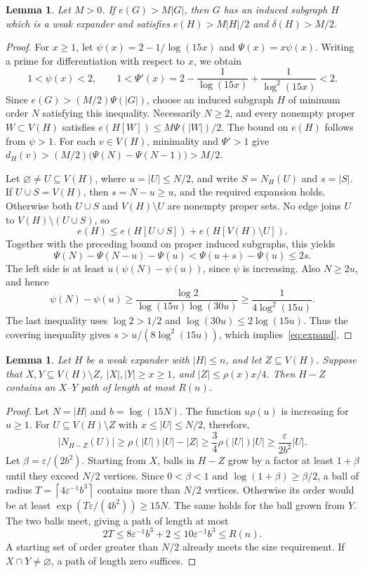 \documentclass[10pt,letterpaper]{article}
\newtheorem{lemma}[theorem]{Lemma}
\theoremstyle{definition}
\theoremstyle{remark}
\newcommand{\eps}{\varepsilon}
\begin{document}
\begin{lemma}\label{lem:extract}
Let $M>0$. If $e(G)>M|G|$, then $G$ has an induced subgraph $H$ which is a weak expander and satisfies $e(H)>M|H|/2$ and $\delta(H)>M/2$.
\end{lemma}
\begin{proof}
For $x\ge1$, let $\psi(x)=2-1/\log(15x)$ and $\Psi(x)=x\psi(x)$. Writing a prime for differentiation with respect to $x$, we obtain
\[
1<\psi(x)<2,\qquad
1<\Psi'(x)=2-\frac1{\log(15x)}+\frac1{\log^2(15x)}<2.
\]
Since $e(G)>(M/2)\Psi(|G|)$, choose an induced subgraph $H$ of minimum order $N$ satisfying this inequality. Necessarily $N\ge2$, and every nonempty proper $W\subset V(H)$ satisfies $e(H[W])\le M\Psi(|W|)/2$. The bound on $e(H)$ follows from $\psi>1$. For each $v\in V(H)$, minimality and $\Psi'>1$ give $d_H(v)>(M/2)\bigl(\Psi(N)-\Psi(N-1)\bigr)>M/2$.

Let $\varnothing\ne U\subseteq V(H)$, where $u=|U|\le N/2$, and write $S=N_H(U)$ and $s=|S|$. If $U\cup S=V(H)$, then $s=N-u\ge u$, and the required expansion holds. Otherwise both $U\cup S$ and $V(H)\setminus U$ are nonempty proper sets. No edge joins $U$ to $V(H)\setminus(U\cup S)$, so
\[
e(H)\le e(H[U\cup S])+e(H[V(H)\setminus U]).
\]
Together with the preceding bound on proper induced subgraphs, this yields
\[
\Psi(N)-\Psi(N-u)-\Psi(u)
<\Psi(u+s)-\Psi(u)\le2s.
\]
The left side is at least $u(\psi(N)-\psi(u))$, since $\psi$ is increasing. Also $N\ge2u$, and hence
\[
\psi(N)-\psi(u)\ge\frac{\log2}{\log(15u)\log(30u)}
\ge\frac1{4\log^2(15u)}.
\]
The last inequality uses $\log2>1/2$ and $\log(30u)\le2\log(15u)$. Thus the covering inequality gives $s>u/(8\log^2(15u))$, which implies~\eqref{eq:expand}.
\end{proof}

\begin{lemma}\label{lem:connect}
Let $H$ be a weak expander with $|H|\le n$, and let $Z\subseteq V(H)$. Suppose that $X,Y\subseteq V(H)\setminus Z$, $|X|,|Y|\ge x\ge1$, and $|Z|\le\rho(x)x/4$. Then $H-Z$ contains an $X$--$Y$ path of length at most $R(n)$.
\end{lemma}
\begin{proof}
Let $N=|H|$ and $b=\log(15N)$. The function $u\rho(u)$ is increasing for $u\ge1$. For $U\subseteq V(H)\setminus Z$ with $x\le|U|\le N/2$, therefore,
\[
|N_{H-Z}(U)|\ge\rho(|U|)|U|-|Z|
\ge\frac34\rho(|U|)|U|
\ge\frac{\eps}{2b^2}|U|.
\]
Let $\beta=\eps/(2b^2)$. Starting from $X$, balls in $H-Z$ grow by a factor at least $1+\beta$ until they exceed $N/2$ vertices. Since $0<\beta<1$ and $\log(1+\beta)\ge\beta/2$, a ball of radius $T=\left\lceil4\eps^{-1}b^3\right\rceil$ contains more than $N/2$ vertices. Otherwise its order would be at least $\exp(T\eps/(4b^2))\ge15N$. The same holds for the ball grown from $Y$. The two balls meet, giving a path of length at most
\[
2T\le8\eps^{-1}b^3+2\le10\eps^{-1}b^3\le R(n).
\]
A starting set of order greater than $N/2$ already meets the size requirement. If $X\cap Y\ne\varnothing$, a path of length zero suffices.
\end{proof}
\end{document}
